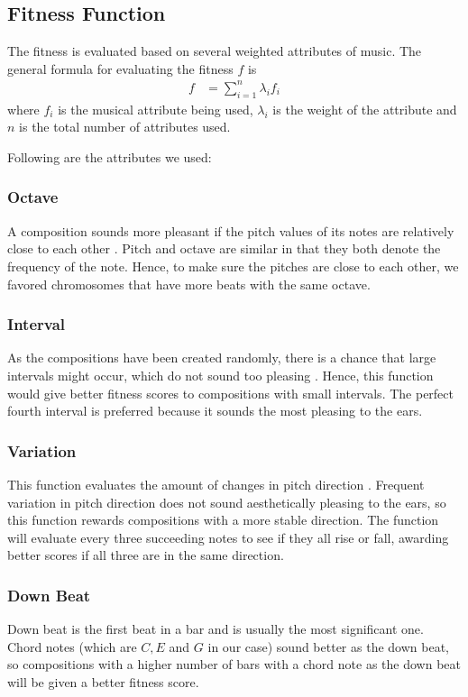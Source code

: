\documentclass[conference]{IEEEtran}
\begin{document}
\subsection{Fitness Function}
The fitness is evaluated based on several weighted attributes of music. The general formula for evaluating the fitness $f$ is
\begin{align*}
f &= \sum_{i=1}^{n} \lambda_{i}f_{i}
\end{align*}
where $f_{i}$ is the musical attribute being used, $\lambda_{i}$ is the weight of the attribute and $n$ is the total number of attributes used.

Following are the attributes we used:

\subsubsection{Octave}
A composition sounds more pleasant if the pitch values of its notes are relatively close to each other \cite{b2}. Pitch and octave are similar in that they both denote the frequency of the note. Hence, to make sure the pitches are close to each other, we favored chromosomes that have more beats with the same octave.

\subsubsection{Interval}
As the compositions have been created randomly, there is a chance that large intervals might occur, which do not sound too pleasing \cite{b6}. Hence, this function would give better fitness scores to compositions with small intervals. The perfect fourth interval is preferred \cite{b4} because it sounds the most pleasing to the ears.

\subsubsection{Variation}
This function evaluates the amount of changes in pitch direction \cite{b2}. Frequent variation in pitch direction does not sound aesthetically pleasing to the ears, so this function rewards compositions with a more stable direction. The function will evaluate every three succeeding notes to see if they all rise or fall, awarding better scores if all three are in the same direction.

\subsubsection{Down Beat}
Down beat is the first beat in a bar and is usually the most significant one. Chord notes (which are $C, E$ and $G$ in our case) sound better as the down beat, so compositions with a higher number of bars with a chord note as the down beat will be given a better fitness score.
\end{document}
